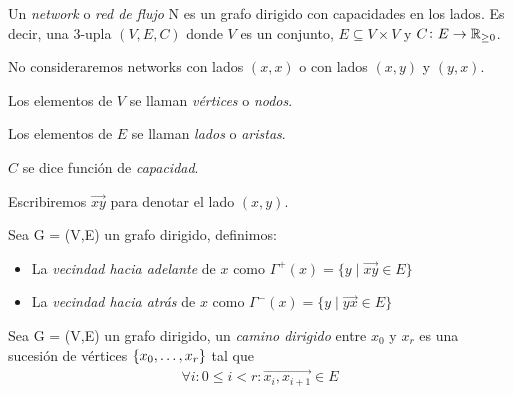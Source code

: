 \begin{definition}
  Un \emph{network} o \emph{red de flujo}  N es un grafo dirigido con capacidades
  en los lados. Es decir, una $3$-upla $(V, E, C)$ donde $V$ es un conjunto,
  $E \subseteq V \times V$ y $C \colon E \to \mathbb{R}_{\ge 0}$.

  No consideraremos networks con lados $(x,x)$ o con lados $(x,y)$ y $(y,x)$.
\end{definition}

\begin{notation}
  Los elementos de $V$ se llaman \emph{vértices} o \emph{nodos}.

  Los elementos de $E$ se llaman \emph{lados} o \emph{aristas}.

  $C$ se dice función de \emph{capacidad}.

  Escribiremos $\overrightarrow{xy}$ para denotar el lado $(x,y)$.
\end{notation}

\begin{definition}
  Sea G = (V,E) un grafo dirigido, definimos:
  \begin{itemize}
  \item La \emph{vecindad hacia adelante} de $x$ como
    $\Gamma^{+}(x) = \{y\mid \overrightarrow{xy} \in E\}$
  \item La \emph{vecindad hacia atrás} de $x$ como
    $\Gamma^{-}(x) = \{y\mid \overrightarrow{yx} \in E\}$
  \end{itemize}
\end{definition}

\begin{definition}
  Sea G = (V,E) un grafo dirigido, un \emph{camino dirigido} entre $x_0$ y $x_r$
  es una sucesión de vértices $\{x_0,\mathellipsis, x_r\}$ tal que
  \begin{align}
    \forall i: 0\le i < r : \overrightarrow{x_i,x_{i+1}} \in E
  \end{align}
\end{definition}

